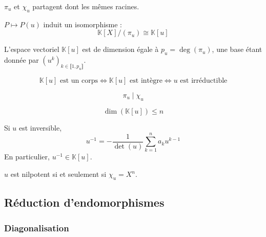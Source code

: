 
  \begin{remark}
    $\pi_u$ et $\chi_u$ partagent dont les mêmes racines.
  \end{remark}


  \begin{theorem}
    $P \mapsto P(u)$ induit un isomorphisme :
    \[ \mathbb{K}[X]/(\pi_u) \cong \mathbb{K}[u] \]
  \end{theorem}

  \begin{corollary}
    L'espace vectoriel $\mathbb{K}[u]$ est de dimension égale à $p_u = \deg(\pi_u)$, une base étant donnée par $(u^k)_{k \in \llbracket 1, p_u \rrbracket}$.
  \end{corollary}

  \begin{corollary}
    \[ \mathbb{K}[u] \text{ est un corps} \iff \mathbb{K}[u] \text{ est intègre} \iff u \text{ est irréductible} \]
  \end{corollary}

  \begin{theorem}
    \[ \pi_u \mid \chi_u \]
  \end{theorem}

  \begin{corollary}
    \[ \dim(\mathbb{K}[u]) \leq n \]
  \end{corollary}

  \begin{corollary}
    Si $u$ est inversible,
    \[ u^{-1} = -\frac{1}{\det(u)} \sum_{k=1}^n a_k u^{k-1} \]
    En particulier, $u^{-1} \in \mathbb{K}[u]$.
  \end{corollary}

  \begin{corollary}
    $u$ est nilpotent si et seulement si $\chi_u = X^n$.
  \end{corollary}

  \subsection{Réduction d'endomorphismes}

  \subsubsection{Diagonalisation}


